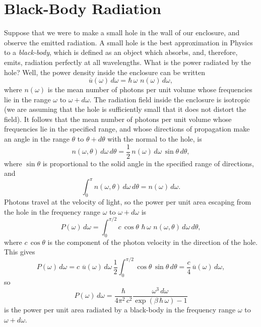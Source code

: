 \section{Black-Body Radiation}
Suppose that we were to make a small hole in the wall of our enclosure,
and observe the emitted radiation. A small hole is the best approximation in
Physics to a {\em black-body}, which is defined as an object which absorbs, and,
therefore, emits, radiation perfectly at all wavelengths. 
What is the  power radiated by the hole? Well, the power density inside the enclosure
can be written
\begin{equation}
\overline{u}(\omega)\,d\omega = \hbar\,\omega\,\, n(\omega)\, d\omega,
\end{equation}
where $n(\omega)$ is the mean 
number of photons per unit volume whose frequencies lie
in the range $\omega$ to $\omega + d\omega$. The radiation field inside the
enclosure is isotropic (we are assuming that the hole is sufficiently small that
it does not distort the field). It follows that the mean number of photons
per unit volume 
whose frequencies lie in the specified range, and
whose directions of propagation make an angle in the range
$\theta$ to $\theta + d\theta$ with the  normal to the hole, is 
\begin{equation}
n(\omega, \theta)\,d\omega\,d\theta = 
\frac{1}{2}\,n(\omega)\,d\omega\,\sin\theta\,d\theta,
\end{equation}
where $\sin\theta$ is proportional to the solid angle in the specified 
range of directions,
and
\begin{equation}
\int_0^\pi n(\omega, \theta)\,d\omega\,d\theta = n(\omega)
\,d\omega.
\end{equation}
Photons travel at the velocity of light, so the power per unit area escaping from
the hole in the frequency range $\omega$ to $\omega+d\omega$  is
\begin{equation}
P(\omega)\, d\omega =\int_0^{\pi/2} c\,\cos\theta\,\,\hbar\,\omega\,\,n(\omega, \theta)
\,d\omega\,d\theta,
\end{equation}
where $c\,\cos\theta$ is the component of the photon velocity in the direction
of the hole.
This gives
\begin{equation}
P(\omega)\, d\omega = c \,\,\overline{u}(\omega)\, d\omega\,\frac{1}{2}\!\int_0^{\pi/2}
\cos\theta\,\sin\theta\,d\theta = \frac{c}{4} \,\overline{u}(\omega)\,d\omega,
\end{equation}
so
\begin{equation}
P(\omega)\,d\omega = \frac{\hbar}{4\pi^2\, c^2} \frac{\omega^3\,d\omega}
{\exp(\beta\,\hbar\,\omega)-1}
\end{equation}
is the power per unit area radiated by a black-body in the frequency range
$\omega$ to $\omega + d\omega$. 

